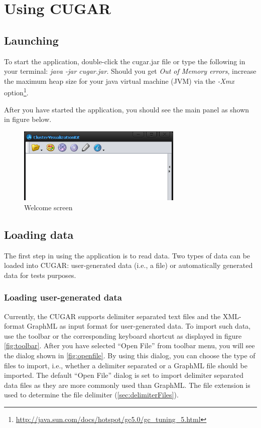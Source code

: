 \documentclass[a4paper, 11pt]{article}
\begin{document}
\section{Using CUGAR}
	\subsection{Launching}
		To start the application, double-click the cugar.jar file or type the following in your terminal: 
		\textit{java -jar cugar.jar}.
		Should you get \textit{Out of Memory errors}, increase the maximum heap size for your java virtual machine 
		(JVM) via the \textit{-Xmx} option\footnote{\url{http://java.sun.com/docs/hotspot/gc5.0/gc_tuning_5.html}}.

		After you have started the application, you should see the main panel as shown in figure below.
		
		\begin{figure}[ht!]
			\centering
			\includegraphics[width = 0.7\textwidth]{img/start.png}
			\caption{Welcome screen}
			\label{fig:start}
		\end{figure}

	\subsection{Loading data}
		The first step in using the application is to read data. Two types of data can be loaded into CUGAR: 
		user-generated data (i.e., a file) or automatically generated data for tests purposes. 

	\subsubsection{Loading user-generated data} \label{sec:openfile}
		Currently, the CUGAR supports delimiter separated text files and the XML-format GraphML as input format for user-generated data.  
		To import such data, use the toolbar or the corresponding keyboard shortcut as displayed in figure \ref{fig:toolbar}. 
		After you have selected ``Open File'' from toolbar menu, you will see the dialog shown in \ref{fig:openfile}. 
		By using this dialog, you can choose the type of files to import, i.e., whether a delimiter separated or a GraphML file should be imported. 
		The default ``Open File'' dialog is set to import delimiter separated data files as they are more commonly used than GraphML. 
		The file extension is used to determine the file delimiter (\ref{sec:delimiterFiles}).
		
\end{document}
